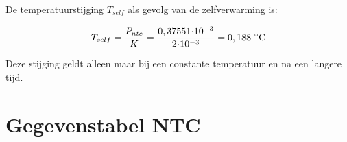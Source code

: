\documentclass[12pt,a4paper,final,twoside,fleqn]{article}
\newcommand{\rntc}{R_\text{NTC}}
\newcommand{\ropt}{R_{opt}}
\let\oldcdot\cdot
\renewcommand{\cdot}{\kern-.10em\oldcdot\kern-.10em}
\begin{document}
De temperatuurstijging $T_{self}$ als gevolg van de
zelfverwarming is:
 
\begin{equation}
T_{self} = \dfrac{P_{ntc}}{K} = \dfrac{0,37551\cdot10^{-3}}{2\cdot10^{-3}}=0,188\ ^\circ\text{C}
\end{equation}

Deze stijging geldt alleen maar bij een constante temperatuur en na een langere tijd.


\appendix

\clearpage
\section{Gegevenstabel NTC}
\end{document}
